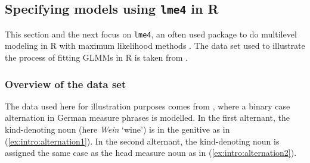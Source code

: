 \subsection{Specifying models using \texttt{lme4} in R}
\label{sec:specifyingmodelsusinglme4inr}

This section and the next focus on \texttt{lme4}, an often used package to do multilevel modeling in R with maximum likelihood methods \citep{BatesEa2015}.
The data set used to illustrate the process of fitting GLMMs in R is taken from \citet{Schaefer2018}.

\subsubsection{Overview of the data set}

The data used here for illustration purposes comes from \citet{Schaefer2018}, where a binary case alternation in German measure phrases is modelled.
In the first alternant, the kind-denoting noun (here \textit{Wein} `wine') is in the genitive as in (\ref{ex:intro:alternation1}).
In the second alternant, the kind-denoting noun is assigned the same case as the head measure noun as in (\ref{ex:intro:alternation2}).

\begin{exe}
  \ex\label{ex:intro:alternation}
  \begin{xlist}
  \end{xlist}
\end{exe}

